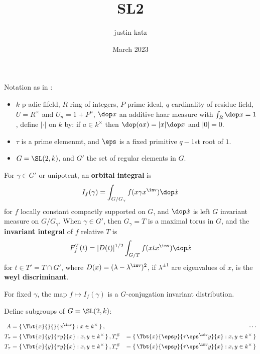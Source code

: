 \documentclass{article}
\title{SL2}
\author{justin katz}
\date{March 2023}
\begin{document}
Notation as in \cite{sallyFourierTransformOrbital1983}:
\begin{itemize}
    \item $k$ p-adic fifeld, $R$ ring of integers, $P$ prime ideal, $q$ cardinality of residue field, $U = R^\times$ and $U_n = 1 + P^n$, $\dop x$ an additive haar measure with $\int_R \dop x =1$, define $|\cdot|$ on $k$ by: if $a\in k^\times$ then $\dop(ax) = |x| \dop x$ and $|0|=0$. 
    \item $\tau$ is a prime elemenmt, and $\eps$ is a fixed primitive $q-1$st root of $1$. 
    \item $G = \SL(2,k)$, and $G'$ the set of regular elements in $G$. 
\end{itemize}

For $\gamma \in G'$ or unipotent, an \textbf{orbital integral} is
\begin{align*}
    I_f(\gamma) = \int_{G/G_\gamma}f(x \gamma x^\inv)\dop \dot{x} 
\end{align*}
for $f$ locally constant compactly supported on $G$, and $\dop \dot{x}$ is left $G$ invariant measure on $G/G_\gamma$. When $\gamma \in G'$, then $G_\gamma =T$ is a maximal torus in $G$, and the \textbf{invariant integral} of $f$ relative $T$ is 
\begin{align*}
    F_f^T(t) = |D(t)|^{1/2} \int_{G/T} f(xtx^\inv)\dop \dot{x}
\end{align*}
for $t\in T' = T\cap G'$, where $D(x) = (\lambda-\lambda^\inv)^2$, if $\lambda^{\pm 1}$ are eigenvalues of $x$, is the \textbf{weyl discriminant}. 

For fixed $\gamma$, the map $f\mapsto I_f(\gamma)$ is a $G$-conjugation invariant distribution. 

Define subgroups of $G=\SL(2,k)$:

\begin{align*}
    A &= \set{\Tbt{x}{}{}{x^\inv}: x \in k^\times},\quad  & \cdots   \\
    T_\tau &= \set{\Tbt{x}{y}{\tau y}{x}: x,y \in k^\times},   T_\tau^\# &= \set{\Tbt{x}{\eps y}{\tau\eps^\inv y}{x}: x,y \in k^\times} \\
    T_\tau &= \set{\Tbt{x}{y}{\tau y}{x}: x,y \in k^\times}, T_\tau^\# &= \set{\Tbt{x}{\eps y}{\tau\eps^\inv y}{x}: x,y \in k^\times} 
\end{align*}




\end{document}
